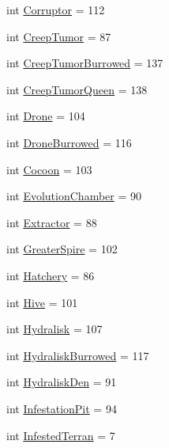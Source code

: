 \begin{DoxyCompactItemize}
int \mbox{\hyperlink{classpysc2_1_1lib_1_1units_1_1_zerg_a82da130b7d88ecb1a0a972364df500bf}{Corruptor}} = 112
\item 
int \mbox{\hyperlink{classpysc2_1_1lib_1_1units_1_1_zerg_a1edb4e19ff0aff1bbfc254ba98b0cc58}{Creep\+Tumor}} = 87
\item 
int \mbox{\hyperlink{classpysc2_1_1lib_1_1units_1_1_zerg_a092d30c2270d324d7d28af40a2664da1}{Creep\+Tumor\+Burrowed}} = 137
\item 
int \mbox{\hyperlink{classpysc2_1_1lib_1_1units_1_1_zerg_a5d8d16851efee358dd35c722adc1f099}{Creep\+Tumor\+Queen}} = 138
\item 
int \mbox{\hyperlink{classpysc2_1_1lib_1_1units_1_1_zerg_a5fb5137efbbe1829520b3af424286c39}{Drone}} = 104
\item 
int \mbox{\hyperlink{classpysc2_1_1lib_1_1units_1_1_zerg_ad91154444a88765f0c227d034f14bbe0}{Drone\+Burrowed}} = 116
\item 
int \mbox{\hyperlink{classpysc2_1_1lib_1_1units_1_1_zerg_ab3dda24c2d36897eab9bf1e73cb51f1a}{Cocoon}} = 103
\item 
int \mbox{\hyperlink{classpysc2_1_1lib_1_1units_1_1_zerg_a9bbf86bb008c1ebbc79a0fd93a646607}{Evolution\+Chamber}} = 90
\item 
int \mbox{\hyperlink{classpysc2_1_1lib_1_1units_1_1_zerg_a5bc1961f2a6c5e3196bcb547b78c5c0b}{Extractor}} = 88
\item 
int \mbox{\hyperlink{classpysc2_1_1lib_1_1units_1_1_zerg_aa89e4de1de841059313c3d794d931dd2}{Greater\+Spire}} = 102
\item 
int \mbox{\hyperlink{classpysc2_1_1lib_1_1units_1_1_zerg_a0c41bd32f79c46ca44c9863a58ecc3b5}{Hatchery}} = 86
\item 
int \mbox{\hyperlink{classpysc2_1_1lib_1_1units_1_1_zerg_a296798c3b5063d65f563030bef9e479d}{Hive}} = 101
\item 
int \mbox{\hyperlink{classpysc2_1_1lib_1_1units_1_1_zerg_a6dcb9ee9f6579caf5416eebd00a21b26}{Hydralisk}} = 107
\item 
int \mbox{\hyperlink{classpysc2_1_1lib_1_1units_1_1_zerg_ad6ccbcddf6ad5a24986e29c806c6576c}{Hydralisk\+Burrowed}} = 117
\item 
int \mbox{\hyperlink{classpysc2_1_1lib_1_1units_1_1_zerg_a792f35857d305bc4d41c1c572810af37}{Hydralisk\+Den}} = 91
\item 
int \mbox{\hyperlink{classpysc2_1_1lib_1_1units_1_1_zerg_a286f3e74465133db67634bf1eac5ecfa}{Infestation\+Pit}} = 94
\item 
int \mbox{\hyperlink{classpysc2_1_1lib_1_1units_1_1_zerg_ac5e3cbfc842a059deadc792e3aabb34d}{Infested\+Terran}} = 7

\end{DoxyCompactItemize}
